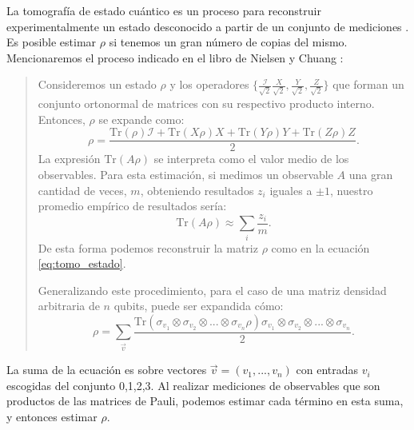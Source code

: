 \documentclass[letterpaper,12pt]{thesisECFM}
\theoremstyle{plain}
\theoremstyle{definition}
\theoremstyle{definition}
\theoremstyle{remark}
\newcommand{\1}{\mathbb{1}}
\begin{document}
La tomografía de estado cuántico es un proceso para reconstruir
experimentalmente un estado desconocido a partir de un conjunto de mediciones
\cite{nielsen_chuang_2011}. Es posible estimar $\rho$ si tenemos un gran número de copias del mismo. Mencionaremos el proceso
indicado en el libro de Nielsen y Chuang \cite{nielsen_chuang_2011}:
\begin{quote}
Consideremos un estado $\rho$ y los operadores $\{\frac{\mathcal{I}}{\sqrt{2}}
\frac{X}{\sqrt{2}},  \frac{Y}{\sqrt{2}},  \frac{Z}{\sqrt{2}} \} $ que forman un
conjunto ortonormal de matrices con su respectivo producto interno. Entonces,
$\rho$ se expande como:
\begin{equation}
\label{eq:tomo_estado}
    \rho = \frac{\text{Tr}(\rho)\mathcal{I} + \text{Tr}(X\rho)X  + \text{Tr}(Y\rho)Y + \text{Tr}(Z\rho)Z}  {2}.
\end{equation}
La expresión $\text{Tr}(A\rho)$ se interpreta como el valor medio de los observables. Para esta estimación, si medimos un observable $A$ una gran cantidad de veces, $m$, obteniendo resultados $z_i$ iguales a $\pm 1$, nuestro promedio empírico de resultados sería:
\begin{equation}
    \text{Tr}(A \rho) \approx \sum_i \frac{z_i}{m}.
\end{equation}
De esta forma podemos reconstruir la matriz $\rho$ como en la ecuación \ref{eq:tomo_estado}.  

Generalizando este procedimiento, para el caso de una matriz densidad arbitraria de $n$ qubits, puede ser expandida cómo:
\begin{equation}
\rho = \sum_{\vec{v}} \frac{ \text{Tr}(\sigma_{v_1} \otimes \sigma_{v_2} \otimes ... \otimes \sigma_{v_n} \rho  ) \sigma_{v_1} \otimes \sigma_{v_2 } \otimes ... \otimes \sigma_{v_n}     }{2}.
\end{equation}
\end{quote}
La suma de la ecuación es sobre vectores $\vec{v} = (v_1,...,v_n)$ con entradas $v_i$ escogidas del conjunto 0,1,2,3. Al realizar mediciones de observables que son productos de las matrices de Pauli, podemos estimar cada término en esta suma, y entonces estimar $\rho$. 
\end{document}
